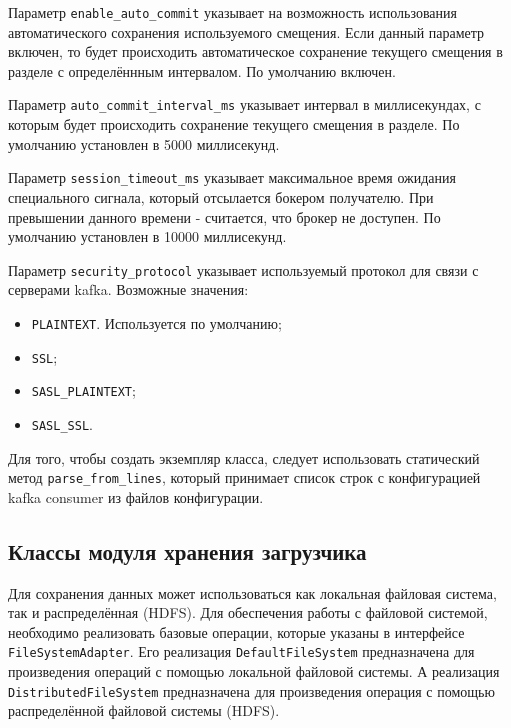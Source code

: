 Параметр \texttt{enable\_auto\_commit} указывает на возможность использования автоматического сохранения используемого смещения.
Если данный параметр включен, то будет происходить автоматическое сохранение текущего смещения в разделе с определённным интервалом.
По умолчанию включен.

Параметр \texttt{auto\_commit\_interval\_ms} указывает интервал в миллисекундах, с которым будет происходить сохранение текущего смещения в разделе.
По умолчанию установлен в 5000 миллисекунд.

Параметр \texttt{session\_timeout\_ms} указывает максимальное время ожидания специального сигнала, который отсылается бокером получателю.
При превышении данного времени - считается, что брокер не доступен.
По умолчанию установлен в 10000 миллисекунд.

Параметр \texttt{security\_protocol} указывает используемый протокол для связи с серверами kafka.
Возможные значения:
\begin{itemize}
    \item \texttt{PLAINTEXT}. Используется по умолчанию;
    \item \texttt{SSL};
    \item \texttt{SASL\_PLAINTEXT};
    \item \texttt{SASL\_SSL}.
\end{itemize}

Для того, чтобы создать экземпляр класса, следует использовать статический метод \texttt{parse\_from\_lines}, который принимает список строк с конфигурацией kafka consumer из файлов конфигурации.





\subsection{Классы модуля хранения загрузчика}
Для сохранения данных может использоваться как локальная файловая система, так и распределённая (HDFS).
Для обеспечения работы с файловой системой, необходимо реализовать базовые операции, которые указаны в интерфейсе \texttt{FileSystemAdapter}.
Его реализация \texttt{DefaultFileSystem} предназначена для произведения операций с помощью локальной файловой системы.
А реализация \texttt{DistributedFileSystem} предназначена для произведения операция с помощью распределённой файловой системы (HDFS).


